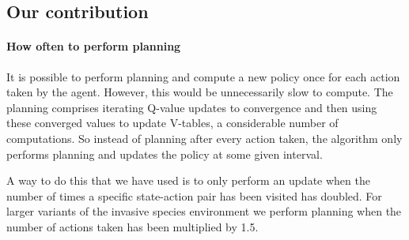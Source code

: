 \subsection{Our contribution}
\paragraph{How often to perform planning}
\label{sec:mbie_perform_planning}

It is possible to perform planning and compute a new policy once for each
action taken by the agent. However, this would be unnecessarily slow to
compute. The planning comprises iterating Q-value updates to convergence and
then using these converged values to update V-tables, a considerable number of
computations. So instead of planning after every action taken, the algorithm
only performs planning and updates the policy at some given interval. 

A way to do this that we have used is to only perform an update when the
number of times a specific state-action pair has been visited has doubled. For
larger variants of the invasive species environment we perform planning when
the number of actions taken has been multiplied by 1.5.
